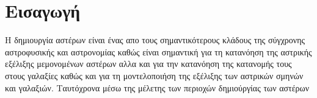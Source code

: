 \documentclass[a4paper,11pt]{memoir}
\begin{document}
\section{Εισαγωγή}
Η δημιουργία αστέρων είναι ένας απο τους σημαντικότερους κλάδους της σύγχρονης αστροφυσικής και αστρονομίας καθώς είναι σημαντική για τη κατανόηση της αστρικής εξέλιξης μεμονομένων αστέρων αλλα και για την κατανόηση της κατανομής τους στους γαλαξίες καθώς και για τη μοντελοποιήση της εξέλιξης των αστρικών σμηνών και γαλαξιών.
Ταυτόχρονα μέσω της μέλετης των περιοχών δημιούργίας των αστέρων 
\end{document}
